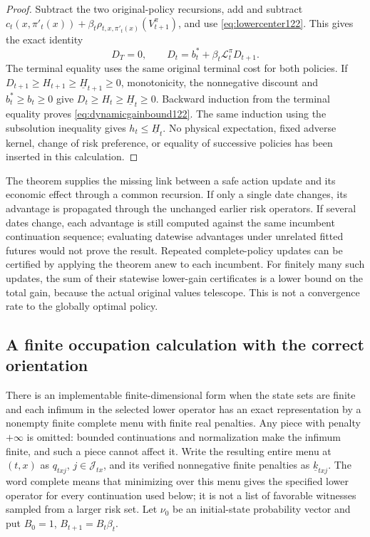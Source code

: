 \begin{proof}
Subtract the two original-policy recursions, add and subtract
$c_t(x,\pi'_t(x))+
 \beta_t\rho_{t,x,\pi'_t(x)}(V_{t+1}^\pi)$,
and use \eqref{eq:lowercenter122}. This gives the exact identity
\begin{equation}\label{eq:exactdynamicgain122}
        D_T=0,\qquad
        D_t=b_t^*+\beta_t\mathcal L_t^\pi D_{t+1}.
\end{equation}
The terminal equality uses the same original terminal cost for both
policies. If $D_{t+1}\ge H_{t+1}\ge\underline H_{t+1}\ge0$,
monotonicity, the nonnegative discount and $b_t^*\ge b_t\ge0$
give $D_t\ge H_t\ge\underline H_t\ge0$.
Backward induction from the terminal equality proves
\eqref{eq:dynamicgainbound122}. The same induction using the subsolution
inequality gives $h_t\le\underline H_t$. No physical expectation,
fixed adverse kernel, change of risk preference, or equality of
successive policies has been inserted in this calculation.
\end{proof}

The theorem supplies the missing link between a safe action update and
its economic effect through a common recursion. If only a single date
changes, its advantage is propagated through the unchanged earlier risk
operators. If several dates change, each advantage is still computed
against the same incumbent continuation sequence; evaluating datewise
advantages under unrelated fitted futures would not prove the result.
Repeated complete-policy updates can be certified by applying the theorem
anew to each incumbent. For finitely many such updates, the sum of their
statewise lower-gain certificates is a lower bound on the total gain,
because the actual original values telescope. This is not a convergence
rate to the globally optimal policy.

\subsection{A finite occupation calculation with the correct orientation}

There is an implementable finite-dimensional form when the state sets are
finite and each infimum in the selected lower operator has an exact
representation by a nonempty finite complete menu with finite real penalties.
Any piece with penalty $+\infty$ is omitted: bounded continuations and
normalization make the infimum finite, and such a piece cannot affect it.
Write the resulting entire menu at $(t,x)$ as
$q_{txj}$, $j\in\mathcal J_{tx}$, and its verified nonnegative finite
penalties as $\underline k_{txj}$. The word complete means that minimizing
over this menu gives the specified lower operator for every continuation used below;
it is not a list of favorable witnesses sampled from a larger risk set.
Let $\nu_0$ be an initial-state probability vector and put
$B_0=1$, $B_{t+1}=B_t\beta_t$.

